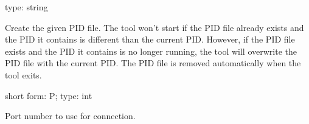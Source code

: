 \documentclass[letterpaper,10pt,english]{sphinxmanual}
\begin{document}

\begin{fulllineitems}
\label{\detokenize{mariadb-config-diff:cmdoption-mariadb-config-diff-pid}}
type: string

Create the given PID file.  The tool won’t start if the PID file already
exists and the PID it contains is different than the current PID.  However,
if the PID file exists and the PID it contains is no longer running, the
tool will overwrite the PID file with the current PID.  The PID file is
removed automatically when the tool exits.

\end{fulllineitems}


\begin{fulllineitems}
\label{\detokenize{mariadb-config-diff:cmdoption-mariadb-config-diff-port}}
short form: \sphinxhyphen{}P; type: int

Port number to use for connection.

\end{fulllineitems}

\end{document}
